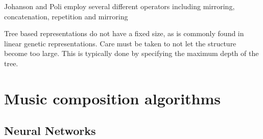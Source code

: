 Johanson and Poli employ several different operators including mirroring, concatenation, repetition and mirroring \cite{Johanson1998}

Tree based representations do not have a fixed size, as is commonly found in linear genetic representations. Care must be taken to not let the structure become too large. This is typically done by specifying the maximum depth of the tree.


\chapter{Music composition algorithms} \label{chap:comp_algo}





\section{Neural Networks}
